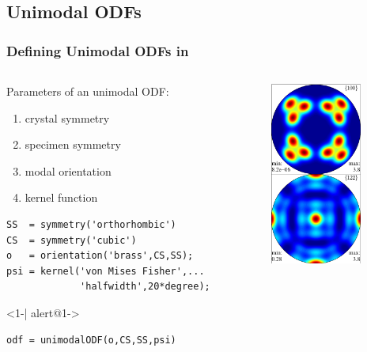 \subsection*{Unimodal ODFs}

\begin{frame}[fragile]
  \frametitle{Defining Unimodal ODFs in \MTEX}

  \begin{columns}

    \begin{column}{8.5cm}

      Parameters of an unimodal ODF:
      \begin{enumerate}
      \item crystal symmetry
      \item specimen symmetry
      \item modal orientation
      \item kernel function
      \end{enumerate}



\begin{lstlisting}
SS  = symmetry('orthorhombic')
CS  = symmetry('cubic')
o   = orientation('brass',CS,SS);
psi = kernel('von Mises Fisher',...
             'halfwidth',20*degree);
\end{lstlisting}

      \begin{actionenv}<1-| alert@1->
\begin{lstlisting}
odf = unimodalODF(o,CS,SS,psi)
\end{lstlisting}
    \end{actionenv}

\end{column}

    \begin{column}{3cm}
      \includegraphics[width=3cm]{pic/unimodalODF}
    \end{column}
  \end{columns}

\end{frame}



